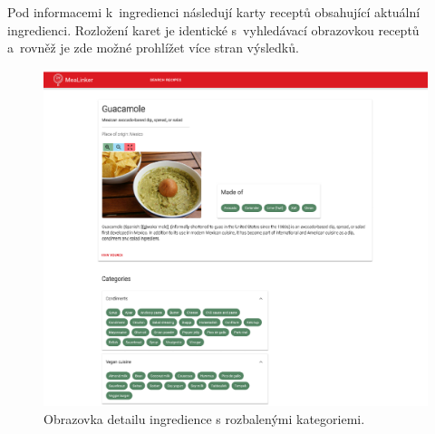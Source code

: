 Pod informacemi k~ingredienci následují karty receptů obsahující aktuální ingredienci. Rozložení karet je identické s~vyhledávací obrazovkou receptů a~rovněž je zde možné prohlížet více stran výsledků. 

\begin{figure}[h!]\centering
\includegraphics[width=140mm]{../img/ingredient-categories}
\caption{Obrazovka detailu ingredience s rozbalenými kategoriemi.}
\label{obr05:ingredient-categories}
\end{figure}